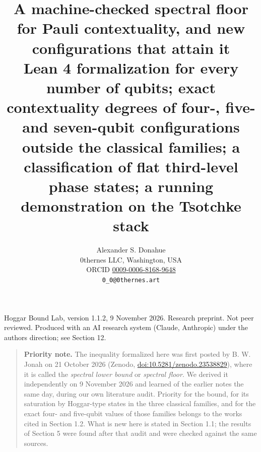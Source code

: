 \documentclass[11pt,a4paper]{article}
\title{A machine-checked spectral floor for Pauli contextuality, and new configurations that attain it\\[0.7em]\large Lean 4 formalization for every number of qubits; exact contextuality degrees of four-, five- and seven-qubit configurations outside the classical families; a classification of flat third-level phase states; a running demonstration on the Tsotchke stack}
\author{Alexander S. Donahue\\ 0thernes LLC, Washington, USA\\ ORCID \href{https://orcid.org/0009-0006-8168-9648}{0009-0006-8168-9648}\\ \texttt{0\_0@0thernes.art}}
\date{}
\begin{document}
\maketitle
\vspace{-2.5em}\begin{center}\small Hoggar Bound Lab, version 1.1.2, 9 November 2026. Research preprint. Not peer reviewed. Produced with an AI research system (Claude, Anthropic) under the author\textquotesingle s direction; see Section 12.\end{center}
\begin{quote}
\textbf{Priority note.} The inequality formalized here was first posted by B. W. Jonah on 21 October 2026
(Zenodo, \href{https://doi.org/10.5281/zenodo.23538829}{doi:10.5281/zenodo.23538829}), where it is called the
\emph{spectral lower bound} or \emph{spectral floor}. We derived it independently on 9 November 2026 and learned of the
earlier notes the same day, during our own literature audit. Priority for the bound, for its saturation
by Hoggar-type states in the three classical families, and for the exact four- and five-qubit values of
those families belongs to the works cited in Section 1.2. What is new here is stated in Section 1.1; the
results of Section 5 were found after that audit and were checked against the same sources.
\end{quote}
\end{document}
